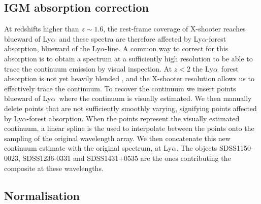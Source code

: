 \documentclass{aa}    %
\newcommand{\sectlabel}[1]{\label{sect:#1}}
\newcommand{\lya}{Ly$\alpha$}
\begin{document}
\subsection{IGM absorption correction} \sectlabel{igm}
At redshifts higher than $z\sim1.6$, the rest-frame coverage of X-shooter
reaches blueward of \lya~and these spectra are therefore affected by
\lya-forest absorption, blueward of the \lya-line. A common way to correct for
this absorption is to obtain a spectrum at a sufficiently high resolution to be
able to trace the continuum emission by visual inspection. At $z < 2 $ the
\lya~forest absorption is not yet heavily blended \citep{DallAglio2008}, and the
X-shooter resolution allows us to effectively trace the continuum. To recover
the continuum we insert points blueward of \lya~where the continuum is visually estimated.
We then manually delete points that are not sufficiently smoothly
varying, signifying points affected by \lya-forest absorption. 
When the points represent the visually estimated continuum, a linear spline is the used to
interpolate between the points onto the sampling of the original wavelength
array. We then concatenate this new continuum estimate with the original
spectrum, at \lya. The objects SDSS1150-0023, SDSS1236-0331 and SDSS1431+0535
are the ones contributing the composite at these wavelengths. 


\subsection{Normalisation}  \sectlabel{norm}
\end{document}
